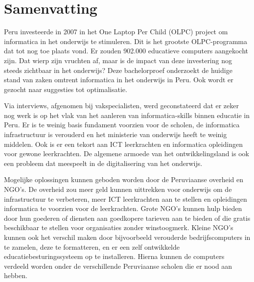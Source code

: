 %
%

%

\chapter*{Samenvatting}
\label{ch:samenvatting}
Peru investeerde in 2007 in het One Laptop Per Child (OLPC) project om informatica in het onderwijs te stimuleren. Dit is het grootste OLPC-programma dat tot nog toe plaats vond. Er zouden 902.000 educatieve computers aangekocht zijn. Dat wierp zijn vruchten af, maar is de impact van deze investering nog steeds zichtbaar in het onderwijs? Deze bachelorproef onderzoekt de huidige stand van zaken omtrent informatica in het onderwijs in Peru. Ook wordt er gezocht naar suggesties tot optimalisatie. 

Via interviews, afgenomen bij vakspecialisten, werd geconstateerd dat er zeker nog werk is op het vlak van het aanleren van informatica-skills binnen educatie in Peru. Er is te weinig basis fundament voorzien voor de scholen, de informatica infrastructuur is verouderd en het ministerie van onderwijs heeft te weinig middelen. Ook is er een tekort aan ICT leerkrachten en informatica opleidingen voor gewone leerkrachten. De algemene armoede van het ontwikkelingsland is ook een probleem dat meespeelt in de digitalisering van het onderwijs. 

Mogelijke oplossingen kunnen geboden worden door de Peruviaanse overheid en NGO's. De overheid zou meer geld kunnen uittrekken voor onderwijs om de infrastructuur te verbeteren, meer ICT leerkrachten aan te stellen en opleidingen informatica te voorzien voor de leerkrachten. Grote NGO's kunnen hulp bieden door hun goederen of diensten aan goedkopere tarieven aan te bieden of die gratis beschikbaar te stellen voor organisaties zonder winstoogmerk. Kleine NGO's kunnen ook het verschil maken door bijvoorbeeld verouderde bedrijfscomputers in te zamelen, deze te formatteren, en er een zelf ontwikkelde educatiebesturingssysteem op te installeren. Hierna kunnen de computers verdeeld worden onder de verschillende Peruviaanse scholen die er nood aan hebben. 

